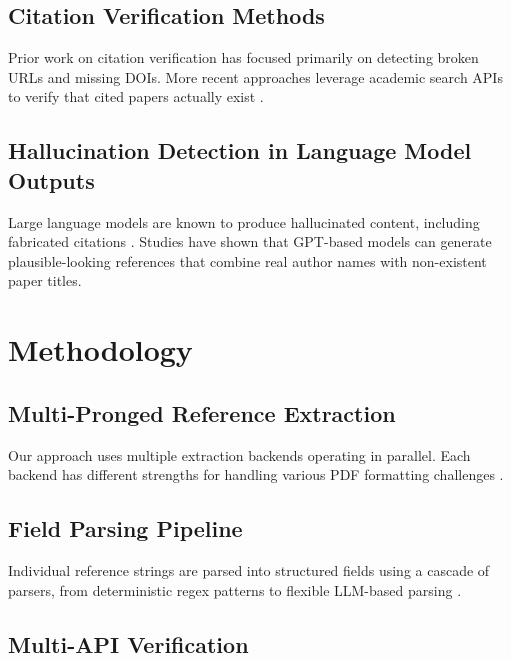 \documentclass[11pt]{article}
\begin{document}
\lipsum[6-8]

\subsection{Citation Verification Methods}

Prior work on citation verification has focused primarily on detecting broken URLs and missing DOIs. More recent approaches leverage academic search APIs to verify that cited papers actually exist \cite{lewis-etal-2020-bart,mikolov-etal-2013-distributed}.

\lipsum[9-11]

\subsection{Hallucination Detection in Language Model Outputs}

Large language models are known to produce hallucinated content, including fabricated citations \cite{pennington-etal-2014-glove}. Studies have shown that GPT-based models can generate plausible-looking references that combine real author names with non-existent paper titles.

\lipsum[12-14]

\section{Methodology}

\subsection{Multi-Pronged Reference Extraction}

Our approach uses multiple extraction backends operating in parallel. Each backend has different strengths for handling various PDF formatting challenges \cite{peters-etal-2018-deep}.

\lipsum[15-17]

\subsection{Field Parsing Pipeline}

Individual reference strings are parsed into structured fields using a cascade of parsers, from deterministic regex patterns to flexible LLM-based parsing \cite{devlin-etal-2019-bert,vaswani-etal-2017-attention}.

\lipsum[18-20]

\subsection{Multi-API Verification}
\end{document}
